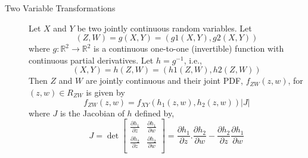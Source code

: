 \documentclass[10pt,landscape]{article}
\begin{document}
\begin{multicols*}{3}
\begin{description}
            \item[Two Variable Transformations]
            Let $X$ and $Y$ be two jointly continuous random variables. Let $$(Z,W)=g(X,Y)=(g1(X,Y),g2(X,Y))$$
            where $g:\mathbb{R}^2 \to \mathbb{R}^2 $ is a continuous one-to-one (invertible) function with continuous partial derivatives. Let $h=g^{-1}$, i.e.,
            $$(X,Y)=h(Z,W)=(h1(Z,W),h2(Z,W))$$
            Then $Z$ and $W$ are jointly continuous and their joint PDF, $f_{ZW}(z,w)$, for $(z,w) \in R_{ZW}$ is given by
            $$f_{ZW}(z,w)=f_{XY}(h_1(z,w),h_2(z,w))|J|$$
            where $J$ is the Jacobian of $h$ defined by,
            $$
            J = \det  \begin{bmatrix}
                          \frac{\partial h_1}{\partial z} & \frac{\partial h_1}{\partial w}  \\
                          \frac{\partial h_2}{\partial z}  & \frac{\partial h_2}{\partial w}  \\
            \end{bmatrix}
            = \frac{\partial h_1}{\partial z}.\frac{\partial h_2}{\partial w}-\frac{\partial h_2}{\partial z}\frac{\partial h_1}{\partial w}
            $$



\end{description}
\end{multicols*}
\end{document}
